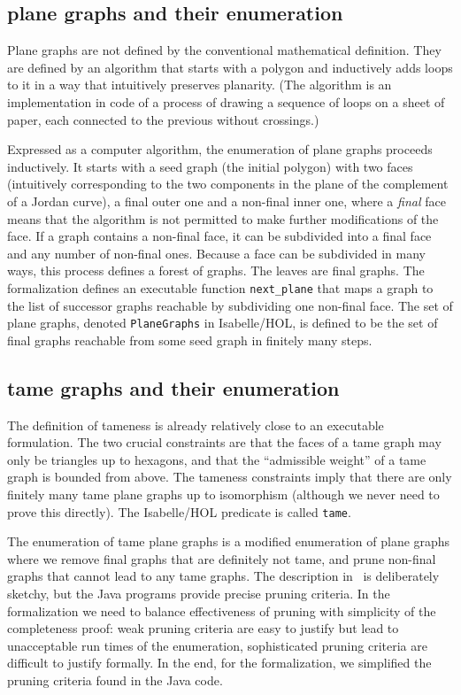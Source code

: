 \subsection{plane graphs and their enumeration}\label{sec:tg}

Plane graphs are not defined by the conventional mathematical
definition. They are defined by an algorithm that starts with a
polygon and inductively adds loops to it in a way that intuitively
preserves planarity.  (The algorithm is an implementation in code of a
process of drawing a sequence of loops on a sheet of paper, each
connected to the previous without crossings.)

Expressed as a computer algorithm, the enumeration of plane graphs
proceeds inductively. It starts with a seed graph (the initial
polygon) with two faces (intuitively corresponding to the two
components in the plane of the complement of a Jordan curve), a final
outer one and a non-final inner one, where a {\it final} face means
that the algorithm is not permitted to make further modifications of
the face.  If a graph contains a non-final face, it can be subdivided
into a final face and any number of non-final ones.  Because a face
can be subdivided in many ways, this process defines a forest of
graphs. The leaves are final graphs.  The formalization defines an
executable function \verb!next_plane!  that maps a graph to the list
of successor graphs reachable by subdividing one non-final face.  The
set of plane graphs, denoted \verb!PlaneGraphs! in Isabelle/HOL, is
defined to be the set of final graphs reachable from some seed graph in
finitely many steps.


\subsection{tame graphs and their enumeration}

The definition of tameness is already relatively close to an
executable formulation. The two crucial constraints are that the faces
of a tame graph may only be triangles up to hexagons, and that the
``admissible weight'' of a tame graph is bounded from above. The
tameness constraints imply that there are only finitely many tame
plane graphs up to isomorphism (although we never need to prove this
directly).  The Isabelle/HOL predicate is called \verb!tame!.

The enumeration of tame plane graphs is a modified enumeration of plane
graphs where we remove final graphs that are definitely not tame, and prune
non-final graphs that cannot lead to any tame graphs.  The description
in~\cite{Hales-Annals} is deliberately sketchy, but the Java programs provide
precise pruning criteria. In the formalization we need to balance
effectiveness of pruning with simplicity of the completeness proof: weak
pruning criteria are easy to justify but lead to unacceptable run times of
the enumeration, sophisticated pruning criteria are difficult to justify
formally. In the end, for the formalization, we simplified the pruning criteria
found in the Java code.

